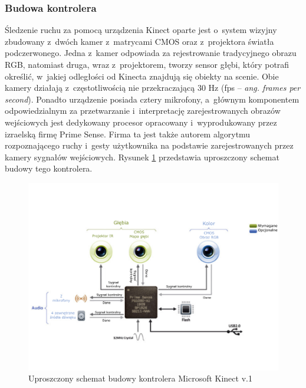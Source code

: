 \subsubsection*{Budowa kontrolera}
Śledzenie ruchu za pomocą urządzenia Kinect oparte jest o~system wizyjny zbudowany z~dwóch kamer z~matrycami CMOS oraz z~projektora światła podczerwonego. Jedna z~kamer odpowiada za rejestrowanie tradycyjnego obrazu RGB, natomiast druga, wraz z~projektorem, tworzy sensor głębi, który potrafi określić, w~jakiej odległości od Kinecta znajdują się obiekty na scenie. Obie kamery działają z~częstotliwością nie przekraczającą 30 Hz (fps -- \emph{ang. frames per second}). Ponadto urządzenie posiada cztery mikrofony, a~głównym komponentem odpowiedzialnym za przetwarzanie i~interpretację zarejestrowanych obrazów wejściowych jest dedykowany procesor opracowany i~wyprodukowany przez izraelską firmę Prime Sense. Firma ta jest także autorem algorytmu rozpoznającego ruchy i~gesty użytkownika na podstawie zarejestrowanych przez kamery sygnałów wejściowych. Rysunek \ref{fig:characteristics:kinect:inside} przedstawia uproszczony schemat budowy tego kontrolera. 
																													
\begin{savenotes}
	\begin{figure}
		\centering
		\includegraphics[width=\textwidth]{images/kinectSchema.png}
		\caption[Uproszczony schemat budowy kontrolera Microsoft Kinect v.1]{Uproszczony schemat budowy kontrolera Microsoft Kinect v.1}
		\label{fig:characteristics:kinect:inside} 
	\end{figure}
\end{savenotes}
																															
